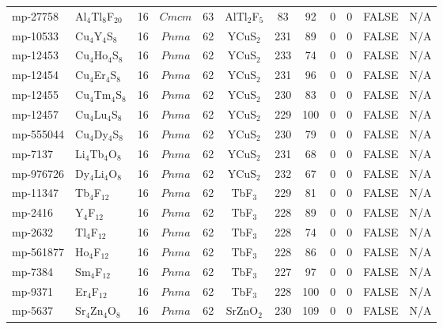 {\begin{longtable}{llcccccccccc}
    mp-27758 & Al$_{4}$Tl$_{8}$F$_{20}$ & 16    & $Cmcm$ & 63    & AlTl$_{2}$F$_{5}$ & 83    & 92    & 0     & 0     & FALSE & N/A \\
    mp-10533 & Cu$_{4}$Y$_{4}$S$_{8}$ & 16    & $Pnma$ & 62    & YCuS$_{2}$ & 231   & 89    & 0     & 0     & FALSE & N/A \\
    mp-12453 & Cu$_{4}$Ho$_{4}$S$_{8}$ & 16    & $Pnma$ & 62    & YCuS$_{2}$ & 233   & 74    & 0     & 0     & FALSE & N/A \\
    mp-12454 & Cu$_{4}$Er$_{4}$S$_{8}$ & 16    & $Pnma$ & 62    & YCuS$_{2}$ & 231   & 96    & 0     & 0     & FALSE & N/A \\
    mp-12455 & Cu$_{4}$Tm$_{4}$S$_{8}$ & 16    & $Pnma$ & 62    & YCuS$_{2}$ & 230   & 83    & 0     & 0     & FALSE & N/A \\
    mp-12457 & Cu$_{4}$Lu$_{4}$S$_{8}$ & 16    & $Pnma$ & 62    & YCuS$_{2}$ & 229   & 100   & 0     & 0     & FALSE & N/A \\
    mp-555044 & Cu$_{4}$Dy$_{4}$S$_{8}$ & 16    & $Pnma$ & 62    & YCuS$_{2}$ & 230   & 79    & 0     & 0     & FALSE & N/A \\
    mp-7137 & Li$_{4}$Tb$_{4}$O$_{8}$ & 16    & $Pnma$ & 62    & YCuS$_{2}$ & 231   & 68    & 0     & 0     & FALSE & N/A \\
    mp-976726 & Dy$_{4}$Li$_{4}$O$_{8}$ & 16    & $Pnma$ & 62    & YCuS$_{2}$ & 232   & 67    & 0     & 0     & FALSE & N/A \\
    mp-11347 & Tb$_{4}$F$_{12}$ & 16    & $Pnma$ & 62    & TbF$_{3}$ & 229   & 81    & 0     & 0     & FALSE & N/A \\
    mp-2416 & Y$_{4}$F$_{12}$ & 16    & $Pnma$ & 62    & TbF$_{3}$ & 228   & 89    & 0     & 0     & FALSE & N/A \\
    mp-2632 & Tl$_{4}$F$_{12}$ & 16    & $Pnma$ & 62    & TbF$_{3}$ & 228   & 74    & 0     & 0     & FALSE & N/A \\
    mp-561877 & Ho$_{4}$F$_{12}$ & 16    & $Pnma$ & 62    & TbF$_{3}$ & 228   & 86    & 0     & 0     & FALSE & N/A \\
    mp-7384 & Sm$_{4}$F$_{12}$ & 16    & $Pnma$ & 62    & TbF$_{3}$ & 227   & 97    & 0     & 0     & FALSE & N/A \\
    mp-9371 & Er$_{4}$F$_{12}$ & 16    & $Pnma$ & 62    & TbF$_{3}$ & 228   & 100   & 0     & 0     & FALSE & N/A \\
    mp-5637 & Sr$_{4}$Zn$_{4}$O$_{8}$ & 16    & $Pnma$ & 62    & SrZnO$_{2}$ & 230   & 109   & 0     & 0     & FALSE & N/A \\

\end{longtable}}
